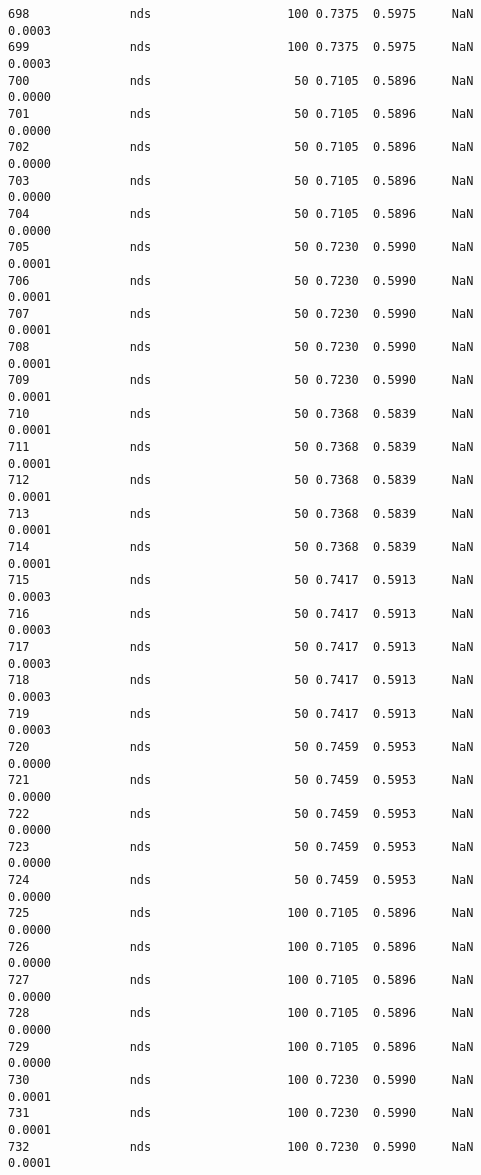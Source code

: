 \documentclass[11pt]{article}
\begin{document}
\begin{Verbatim}[commandchars=\\\{\}]
698              nds                   100 0.7375  0.5975     NaN 0.0003   
699              nds                   100 0.7375  0.5975     NaN 0.0003   
700              nds                    50 0.7105  0.5896     NaN 0.0000   
701              nds                    50 0.7105  0.5896     NaN 0.0000   
702              nds                    50 0.7105  0.5896     NaN 0.0000   
703              nds                    50 0.7105  0.5896     NaN 0.0000   
704              nds                    50 0.7105  0.5896     NaN 0.0000   
705              nds                    50 0.7230  0.5990     NaN 0.0001   
706              nds                    50 0.7230  0.5990     NaN 0.0001   
707              nds                    50 0.7230  0.5990     NaN 0.0001   
708              nds                    50 0.7230  0.5990     NaN 0.0001   
709              nds                    50 0.7230  0.5990     NaN 0.0001   
710              nds                    50 0.7368  0.5839     NaN 0.0001   
711              nds                    50 0.7368  0.5839     NaN 0.0001   
712              nds                    50 0.7368  0.5839     NaN 0.0001   
713              nds                    50 0.7368  0.5839     NaN 0.0001   
714              nds                    50 0.7368  0.5839     NaN 0.0001   
715              nds                    50 0.7417  0.5913     NaN 0.0003   
716              nds                    50 0.7417  0.5913     NaN 0.0003   
717              nds                    50 0.7417  0.5913     NaN 0.0003   
718              nds                    50 0.7417  0.5913     NaN 0.0003   
719              nds                    50 0.7417  0.5913     NaN 0.0003   
720              nds                    50 0.7459  0.5953     NaN 0.0000   
721              nds                    50 0.7459  0.5953     NaN 0.0000   
722              nds                    50 0.7459  0.5953     NaN 0.0000   
723              nds                    50 0.7459  0.5953     NaN 0.0000   
724              nds                    50 0.7459  0.5953     NaN 0.0000   
725              nds                   100 0.7105  0.5896     NaN 0.0000   
726              nds                   100 0.7105  0.5896     NaN 0.0000   
727              nds                   100 0.7105  0.5896     NaN 0.0000   
728              nds                   100 0.7105  0.5896     NaN 0.0000   
729              nds                   100 0.7105  0.5896     NaN 0.0000   
730              nds                   100 0.7230  0.5990     NaN 0.0001   
731              nds                   100 0.7230  0.5990     NaN 0.0001   
732              nds                   100 0.7230  0.5990     NaN 0.0001   

\end{Verbatim}
\end{document}
